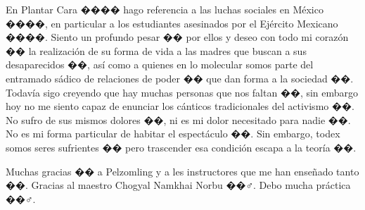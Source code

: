 En Plantar Cara ���� hago referencia a las luchas sociales en México ����, en particular a los estudiantes asesinados por el Ejército Mexicano ����️. Siento un profundo pesar �� por ellos y deseo con todo mi corazón �� la realización de su forma de vida a las madres que buscan a sus desaparecidos ��, así como a quienes en lo molecular somos parte del entramado sádico de relaciones de poder �� que dan forma a la sociedad ��. Todavía sigo creyendo que hay muchas personas que nos faltan ��, sin embargo hoy no me siento capaz de enunciar los cánticos tradicionales del activismo ��. No sufro de sus mismos dolores ��, ni es mi dolor necesitado para nadie ��. No es mi forma particular de habitar el espectáculo ��. Sin embargo, todex somos seres sufrientes �� pero trascender esa condición escapa a la teoría ��.

Muchas gracias �� a Pelzomling y a les instructores que me han enseñado tanto ��. Gracias al maestro Chogyal Namkhai Norbu ��‍♂️. Debo mucha práctica ��‍♂️.